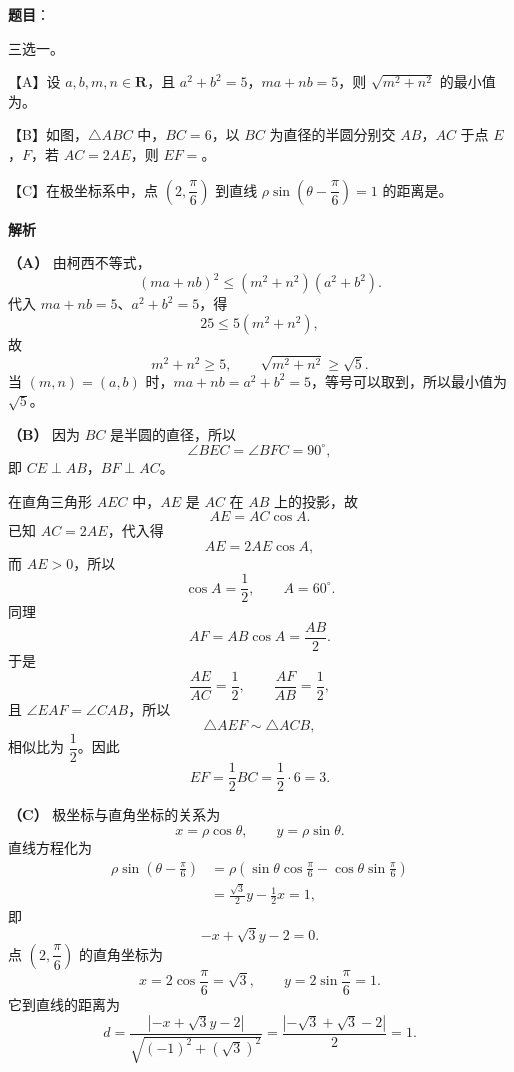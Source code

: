 \begin{answer}

\textbf{题目}：

三选一。

【A】设 $a,b,m,n\in\mathbf R$，且 $a^2+b^2=5$，$ma+nb=5$，则 $\sqrt{m^2+n^2}$ 的最小值为\gkblank{}。

【B】如图，$\triangle ABC$ 中，$BC=6$，以 $BC$ 为直径的半圆分别交 $AB$，$AC$ 于点 $E$，$F$，若 $AC=2AE$，则 $EF=$\gkblank{}。
\nopagebreak[4]
\begin{center}\end{center}
\nopagebreak[4]
【C】在极坐标系中，点 $\left(2,\dfrac\pi6\right)$ 到直线 $\rho\sin\left(\theta-\dfrac\pi6\right)=1$ 的距离是\gkblank{}。

\textbf{解析}

\textbf{（A）} 由柯西不等式，
\nopagebreak[4]
\[(ma+nb)^2\leqslant(m^2+n^2)(a^2+b^2).\]
代入 $ma+nb=5$、$a^2+b^2=5$，得
\nopagebreak[4]
\[25\leqslant5(m^2+n^2),\]
故
\nopagebreak[4]
\[m^2+n^2\geqslant5,\qquad \sqrt{m^2+n^2}\geqslant\sqrt5.\]
当 $(m,n)=(a,b)$ 时，$ma+nb=a^2+b^2=5$，等号可以取到，所以最小值为 $\sqrt5$。

\textbf{（B）} 因为 $BC$ 是半圆的直径，所以
\nopagebreak[4]
\[\angle BEC=\angle BFC=90^\circ,\]
即 $CE\perp AB$，$BF\perp AC$。

在直角三角形 $AEC$ 中，$AE$ 是 $AC$ 在 $AB$ 上的投影，故
\nopagebreak[4]
\[AE=AC\cos A.\]
已知 $AC=2AE$，代入得
\nopagebreak[4]
\[AE=2AE\cos A,\]
而 $AE>0$，所以
\nopagebreak[4]
\[\cos A=\frac12,\qquad A=60^\circ.\]
同理
\nopagebreak[4]
\[AF=AB\cos A=\frac{AB}{2}.\]
于是
\nopagebreak[4]
\[\frac{AE}{AC}=\frac12,\qquad \frac{AF}{AB}=\frac12,\]
且 $\angle EAF=\angle CAB$，所以
\nopagebreak[4]
\[\triangle AEF\sim\triangle ACB,\]
相似比为 $\dfrac12$。因此
\nopagebreak[4]
\[EF=\frac12BC=\frac12\cdot6=3.\]

\textbf{（C）} 极坐标与直角坐标的关系为
\nopagebreak[4]
\[x=\rho\cos\theta,\qquad y=\rho\sin\theta.\]
直线方程化为
\nopagebreak[4]
\[\begin{aligned}
\rho\sin\left(\theta-\frac\pi6\right)
&=\rho\left(\sin\theta\cos\frac\pi6-\cos\theta\sin\frac\pi6\right)\\
&=\frac{\sqrt3}{2}y-\frac12x=1,
\end{aligned}\]
即
\nopagebreak[4]
\[-x+\sqrt3y-2=0.\]
点 $\left(2,\dfrac\pi6\right)$ 的直角坐标为
\nopagebreak[4]
\[x=2\cos\frac\pi6=\sqrt3,\qquad y=2\sin\frac\pi6=1.\]
它到直线的距离为
\nopagebreak[4]
\[d=\frac{|-x+\sqrt3y-2|}{\sqrt{(-1)^2+(\sqrt3)^2}}
=\frac{|-\sqrt3+\sqrt3-2|}{2}=1.\]


\end{answer}
